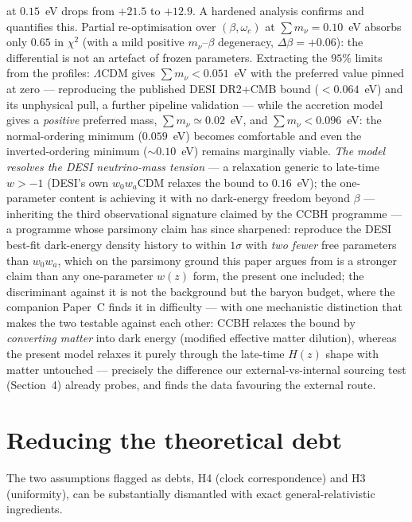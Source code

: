 \documentclass[11pt]{article}
\begin{document}
at $0.15$~eV drops from $+21.5$ to $+12.9$. A hardened analysis confirms and quantifies this. Partial re-optimisation over $(\beta, \omega_c)$ at $\sum m_\nu = 0.10$~eV absorbs only $0.65$ in $\chi^2$ (with a mild positive $m_\nu$--$\beta$ degeneracy, $\Delta\beta = +0.06$): the differential is not an artefact of frozen parameters. Extracting the $95\%$ limits from the profiles: $\Lambda$CDM gives $\sum m_\nu < 0.051$~eV with the preferred value pinned at zero --- reproducing the published DESI DR2+CMB bound ($<0.064$~eV) and its unphysical pull, a further pipeline validation --- while the accretion model gives a \emph{positive} preferred mass, $\sum m_\nu \simeq 0.02$~eV, and $\sum m_\nu < 0.096$~eV: the normal-ordering minimum ($0.059$~eV) becomes comfortable and even the inverted-ordering minimum ($\sim0.10$~eV) remains marginally viable. \emph{The model resolves the DESI neutrino-mass tension} --- a relaxation generic to late-time $w > -1$ (DESI's own $w_0w_a$CDM relaxes the bound to $0.16$~eV); the one-parameter content is achieving it with no dark-energy freedom beyond $\beta$ --- inheriting the third observational signature claimed by the CCBH programme \cite{Croker2024} --- a programme whose parsimony claim has since sharpened: \cite{Croker2024} reproduce the DESI best-fit dark-energy density history to within $1\sigma$ with \emph{two fewer} free parameters than $w_0w_a$, which on the parsimony ground this paper argues from is a stronger claim than any one-parameter $w(z)$ form, the present one included; the discriminant against it is not the background but the baryon budget, where the companion Paper~C finds it in difficulty --- with one mechanistic distinction that makes the two testable against each other: CCBH relaxes the bound by \emph{converting matter} into dark energy (modified effective matter dilution), whereas the present model relaxes it purely through the late-time $H(z)$ shape with matter untouched --- precisely the difference our external-vs-internal sourcing test (Section~4) already probes, and finds the data favouring the external route.

\section{Reducing the theoretical debt}\label{sec:debt}
The two assumptions flagged as debts, H4 (clock correspondence) and H3 (uniformity), can be substantially dismantled with exact general-relativistic ingredients.
\end{document}

